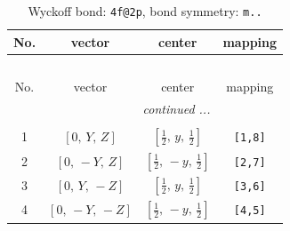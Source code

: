 \documentclass[fleqn,8pt]{jsarticle}
\begin{document}
\renewcommand{\arraystretch}{1.2}
\begin{longtable}{cccc}
\caption{Wyckoff bond: {\tt 4f@2p}, bond symmetry: {\tt m..}}
 \\
 \hline \hline
No. & vector & center & mapping \\ \hline \endfirsthead

\multicolumn{3}{l}{\tablename\ \thetable{}} \\
 \hline \hline
No. & vector & center & mapping \\ \hline \endhead

 \hline \hline
\multicolumn{3}{r}{\footnotesize\it continued ...} \\ \endfoot

 \hline \hline
\multicolumn{3}{r}{} \\ \endlastfoot

1 & $\left[ 0,\, Y,\, Z \right]$ & $\left[ \frac{1}{2},\, y,\, \frac{1}{2} \right]$ & {\tt [1,8]} \\ \hline
2 & $\left[ 0,\, - Y,\, Z \right]$ & $\left[ \frac{1}{2},\, - y,\, \frac{1}{2} \right]$ & {\tt [2,7]} \\ \hline
3 & $\left[ 0,\, Y,\, - Z \right]$ & $\left[ \frac{1}{2},\, y,\, \frac{1}{2} \right]$ & {\tt [3,6]} \\ \hline
4 & $\left[ 0,\, - Y,\, - Z \right]$ & $\left[ \frac{1}{2},\, - y,\, \frac{1}{2} \right]$ & {\tt [4,5]} \\
\end{longtable}
\renewcommand{\arraystretch}{1.2}
\end{document}

